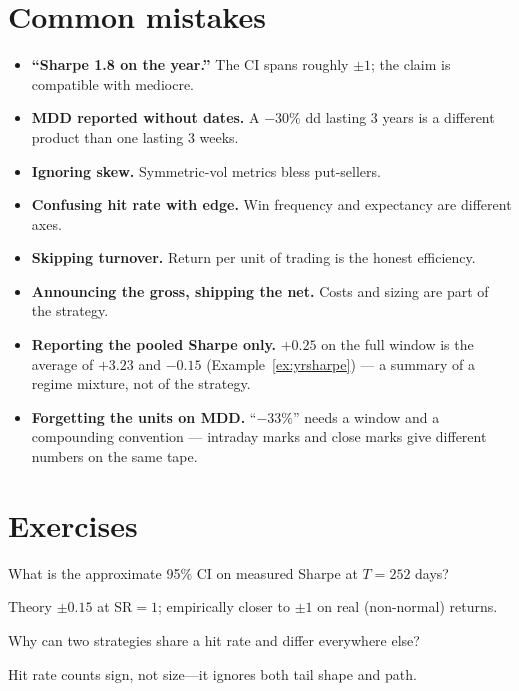 \section{Common mistakes}
\begin{itemize}
\item \textbf{``Sharpe 1.8 on the year.''} The CI spans roughly $\pm1$; the claim is
  compatible with mediocre.
\item \textbf{MDD reported without dates.} A $-30\%$ dd lasting 3 years is a different
  product than one lasting 3 weeks.
\item \textbf{Ignoring skew.} Symmetric-vol metrics bless put-sellers.
\item \textbf{Confusing hit rate with edge.} Win frequency and expectancy are different
  axes.
\item \textbf{Skipping turnover.} Return per unit of trading is the honest efficiency.
\item \textbf{Announcing the gross, shipping the net.} Costs and sizing are part of the
  strategy.
\item \textbf{Reporting the pooled Sharpe only.}
$+0.25$ on the full window is the average of $+3.23$ and
$-0.15$ (Example~\ref{ex:yrsharpe}) --- a summary of a regime
mixture, not of the strategy.
\item \textbf{Forgetting the units on MDD.} ``$-33\%$'' needs a
window and a compounding convention --- intraday marks and close
marks give different numbers on the same tape.\end{itemize}

\section{Exercises}
\begin{exercise}[easy]
What is the approximate 95\% CI on measured Sharpe at $T{=}252$ days?
\end{exercise}
\begin{solution}
Theory $\pm0.15$ at SR${=}1$; empirically closer to $\pm1$ on real (non-normal) returns.
\end{solution}

\begin{exercise}[easy]
Why can two strategies share a hit rate and differ everywhere else?
\end{exercise}
\begin{solution}
Hit rate counts sign, not size---it ignores both tail shape and path.
\end{solution}

